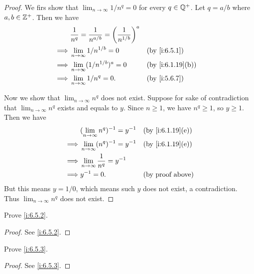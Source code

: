 \begin{proof}
  We firs show that \(\lim_{n \to \infty} 1 / n^q = 0\) for every \(q \in \mathbb{Q}^+\).
  Let \(q = a / b\) where \(a, b \in \mathbb{Z}^+\).
  Then we have
  \begin{align*}
             & \dfrac{1}{n^q} = \dfrac{1}{n^{a / b}} = \bigg(\dfrac{1}{n^{1 / b}}\bigg)^a                       \\
    \implies & \lim_{n \to \infty} 1 / n^{1 / b} = 0                                      &  & \by{i:6.5.1}     \\
    \implies & \lim_{n \to \infty} (1 / n^{1 / b})^a = 0                                  &  & \by{i:6.1.19}[b] \\
    \implies & \lim_{n \to \infty} 1 / n^q = 0.                                           &  & \by{i:5.6.7}
  \end{align*}

  Now we show that \(\lim_{n \to \infty} n^q\) does not exist.
  Suppose for sake of contradiction that \(\lim_{n \to \infty} n^q\) exists and equals to \(y\).
  Since \(n \geq 1\), we have \(n^q \geq 1\), so \(y \geq 1\).
  Then we have
  \begin{align*}
             & (\lim_{n \to \infty} n^q)^{-1} = y^{-1}     &  & \by{i:6.1.19}[e]        \\
    \implies & \lim_{n \to \infty} (n^q)^{-1} = y^{-1}     &  & \by{i:6.1.19}[e]        \\
    \implies & \lim_{n \to \infty} \dfrac{1}{n^q} = y^{-1}                              \\
    \implies & y^{-1} = 0.                                 &  & \text{(by proof above)}
  \end{align*}
  But this means \(y = 1 / 0\), which means such \(y\) does not exist, a contradiction.
  Thus \(\lim_{n \to \infty} n^q\) does not exist.
\end{proof}

\begin{ex}\label{i:ex:6.5.2}
  Prove \cref{i:6.5.2}.
\end{ex}

\begin{proof}
  See \cref{i:6.5.2}.
\end{proof}

\begin{ex}\label{i:ex:6.5.3}
  Prove \cref{i:6.5.3}.
\end{ex}

\begin{proof}
  See \cref{i:6.5.3}.
\end{proof}

